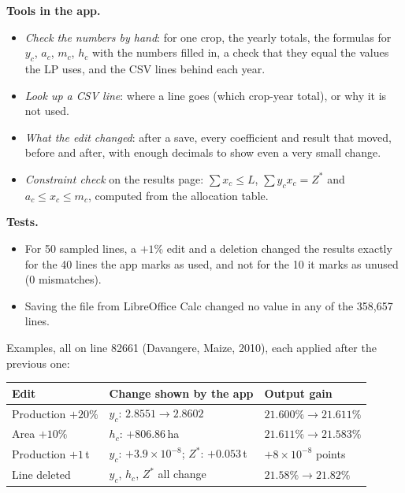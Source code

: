 \documentclass[11pt,a4paper]{article}
\begin{document}
\textbf{Tools in the app.}
\begin{itemize}
  \item \emph{Check the numbers by hand}: for one crop, the yearly totals, the formulas for
        $y_c$, $a_c$, $m_c$, $h_c$ with the numbers filled in, a check that they equal the values
        the LP uses, and the CSV lines behind each year.
  \item \emph{Look up a CSV line}: where a line goes (which crop-year total), or why it is not used.
  \item \emph{What the edit changed}: after a save, every coefficient and result that moved,
        before and after, with enough decimals to show even a very small change.
  \item \emph{Constraint check} on the results page: $\sum x_c \le L$, $\sum y_c x_c = Z^*$ and
        $a_c \le x_c \le m_c$, computed from the allocation table.
\end{itemize}

\textbf{Tests.}
\begin{itemize}
  \item For 50 sampled lines, a $+1\%$ edit and a deletion changed the results exactly for the
        40 lines the app marks as used, and not for the 10 it marks as unused (0 mismatches).
  \item Saving the file from LibreOffice Calc changed no value in any of the 358,657 lines.
\end{itemize}

Examples, all on line 82661 (Davangere, Maize, 2010), each applied after the previous one:
\begin{center}
\begin{tabular}{lll}
\toprule
Edit & Change shown by the app & Output gain \\
\midrule
Production $+20\%$ & $y_c$: $2.8551 \to 2.8602$ & $21.600\% \to 21.611\%$ \\
Area $+10\%$       & $h_c$: $+806.86$\,ha        & $21.611\% \to 21.583\%$ \\
Production $+1$\,t & $y_c$: $+3.9\times10^{-8}$; $Z^*$: $+0.053$\,t & $+8\times10^{-8}$ points \\
Line deleted       & $y_c$, $h_c$, $Z^*$ all change & $21.58\% \to 21.82\%$ \\
\bottomrule
\end{tabular}
\end{center}
\end{document}

